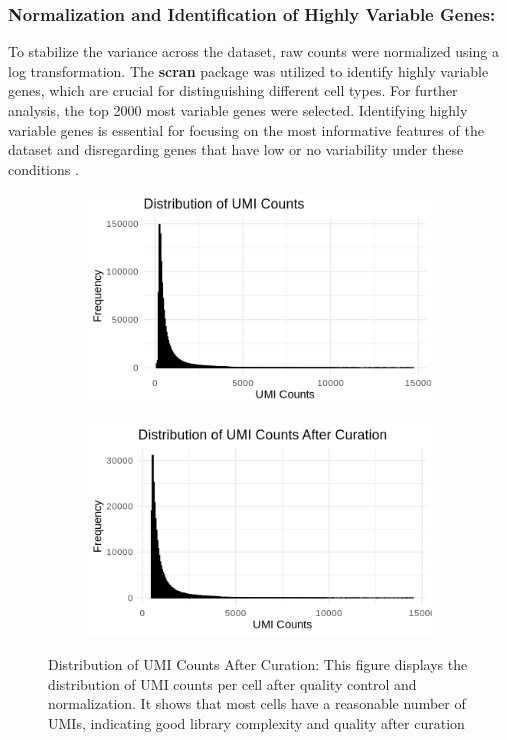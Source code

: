 \documentclass[runningheads]{llncs}
\begin{document}
\subsubsection{Normalization and Identification of Highly Variable Genes:} To stabilize the variance across the dataset, raw counts were normalized using a log transformation. The \textbf{scran} package was utilized to identify highly variable genes, which are crucial for distinguishing different cell types. For further analysis, the top 2000 most variable genes were selected. Identifying highly variable genes is essential for focusing on the most informative features of the dataset and disregarding genes that have low or no variability under these conditions \cite{stuart2019comprehensive}.

\begin{figure}[H]
  \centering
  \begin{subfigure}[b]{0.45\textwidth}
    \centering
    \includegraphics[width=\textwidth]{000016.png}
    \label{fig:mito_umi_before}
  \end{subfigure}
  \hfill
  \begin{subfigure}[b]{0.45\textwidth}
    \centering
    \includegraphics[width=\textwidth]{000010.png}
    \label{fig:umi_counts}
  \end{subfigure}
  \caption{Distribution of UMI Counts After Curation: This figure displays the distribution of UMI counts per cell after quality control and normalization. It shows that most cells have a reasonable number of UMIs, indicating good library complexity and quality after curation}
  \label{fig:umi_distributions}
\end{figure}
\end{document}
